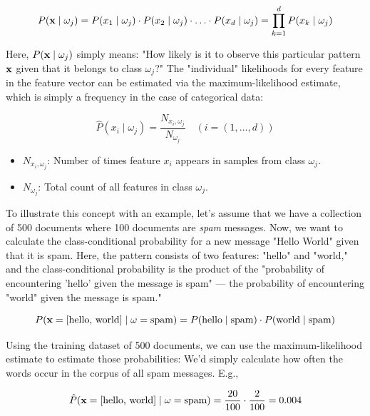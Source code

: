 \documentclass{article}
\begin{document}
\begin{equation} P(\textbf x \mid \omega_j) = P(x_1 \mid \omega_j) \cdot P(x_2 \mid \omega_j) \cdot \ldots \cdot P(x_d \mid \omega_j) =  \prod_{k=1}^{d} P( x_k \mid \omega_j) \end{equation}

Here, $P(\textbf x \mid \omega_j)$ simply means: "How likely is it to observe this particular pattern $\textbf x$ given that it belongs to class $ \omega_j$?" The "individual" likelihoods for every feature in the feature vector can be estimated via the maximum-likelihood estimate, which is simply a frequency in the case of categorical data:
    
\begin{equation} \hat{P}(x_i \mid \omega_j) = \frac{N_{x_i, \omega_j}}{N_{\omega_j}}  \quad (i = (1, ..., d))\end{equation}

\begin{itemize}
	\item $N_{x_i, \omega_j}$: Number of times feature $x_i$ appears in samples from class $\omega_j$.
	\item  $N_{\omega_j}$: Total count of all features in class $\omega_j$.
\end{itemize}

To illustrate this concept with an example, let's assume that we have a collection of 500 documents where 100 documents are \emph{spam} messages. Now, we want to calculate the class-conditional probability for a new message "Hello World" given that it is spam.
Here, the pattern consists of two features: "hello" and "world," and the class-conditional probability is the product of the "probability of encountering 'hello' given the message is spam" --- the probability of encountering "world" given the message is spam."

\begin{equation} P(\textbf x=[\text{hello, world}] \mid \omega=\text{spam}) = P(\text{hello} \mid \text{spam}) \cdot P(\text{world} \mid \text{spam}) \end{equation}


Using the training dataset of 500 documents, we can use the maximum-likelihood estimate to estimate those probabilities: We'd simply calculate how often the words occur in the corpus of all spam messages. E.g., 


\begin{equation} \hat{P}(\textbf x=[\text{hello, world}] \mid \omega=\text{spam}) = \frac{20}{100} \cdot \frac{2}{100} = 0.004 \end{equation}
\end{document}

